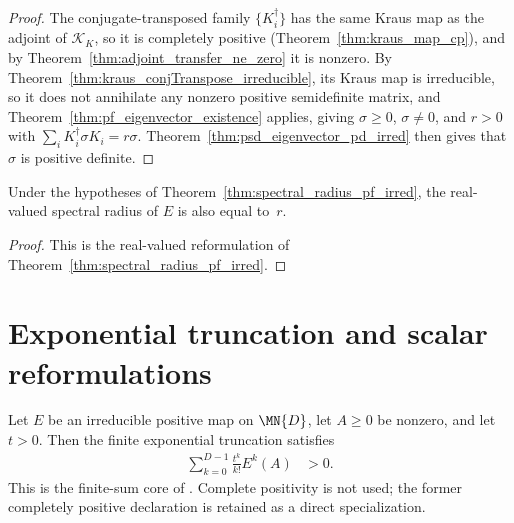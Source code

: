 \begin{proof}\leanok
    The conjugate-transposed family $\{K_i^\dagger\}$ has the same Kraus map
    as the adjoint of $\mathcal K_K$, so it is completely positive
    (Theorem~\ref{thm:kraus_map_cp}), and by
    Theorem~\ref{thm:adjoint_transfer_ne_zero} it is nonzero. By
    Theorem~\ref{thm:kraus_conjTranspose_irreducible}, its Kraus map is
    irreducible, so it does not annihilate any nonzero positive semidefinite
    matrix, and
    Theorem~\ref{thm:pf_eigenvector_existence} applies, giving
    $\sigma \ge 0$, $\sigma \neq 0$, and $r > 0$ with
    $\sum_i K_i^\dagger \sigma K_i = r\sigma$.
    Theorem~\ref{thm:psd_eigenvector_pd_irred} then gives that $\sigma$ is
    positive definite.
\end{proof}

\begin{theorem}
    \label{thm:spectral_radius_real_pf_irred}
    \leanok
    Under the hypotheses of Theorem~\ref{thm:spectral_radius_pf_irred}, the
    real-valued spectral radius of $E$ is also equal to~$r$.
\end{theorem}

\begin{proof}
    \leanok
    This is the real-valued reformulation of
    Theorem~\ref{thm:spectral_radius_pf_irred}.
\end{proof}

\section{Exponential truncation and scalar reformulations}
\label{sec:app_qpf_exponential}

\begin{theorem}
    \label{thm:exp_truncation_pd_irred}
    \leanok
    Let $E$ be an irreducible positive map on $\MN{D}$,
    let $A \ge 0$ be nonzero, and let $t > 0$.
    Then the finite exponential truncation satisfies
    \begin{align}
        \sum_{k=0}^{D-1}\frac{t^k}{k!}E^k(A)
         & >0.
        \label{eq:qpf_exp_truncation}
    \end{align}
    This is the finite-sum core of
    \cite[Theorem~6.2(3)]{Wolf2012Quantum}. Complete positivity is not used;
    the former completely positive declaration is retained as a direct
    specialization.
\end{theorem}

